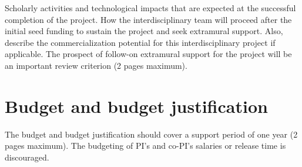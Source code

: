 \documentclass[11pt]{article}
\begin{document}
Scholarly activities and technological impacts that are
expected at the successful completion of the project. How the interdisciplinary
team will proceed after the initial seed funding to sustain the project and seek
extramural support. Also, describe the commercialization potential for this
interdisciplinary project if applicable. The prospect of follow-on extramural
support for the project will be an important review criterion (2 pages maximum).
\clearpage
\section{Budget and budget justification}
The budget and budget justification should cover a support period of one year (2 pages maximum). The budgeting of PI’s and co-PI’s salaries or release time is discouraged.  
\end{document}

